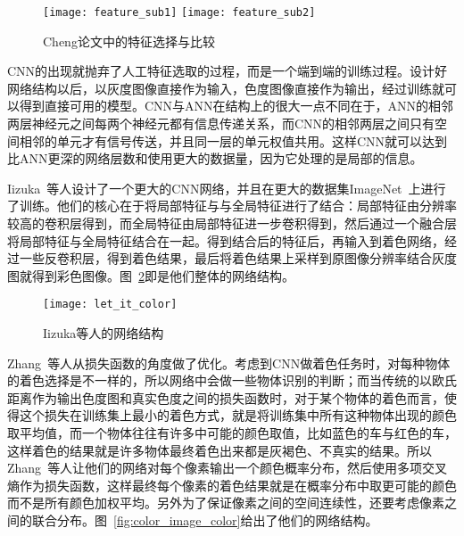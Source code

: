   \begin{figure}[h]
    \centering
      {\texttt{[image: feature\_sub1]}}
    \hspace{4em}
        {\texttt{[image: feature\_sub2]}}
    \caption{Cheng论文中的特征选择与比较}
    \label{fig:feature_choose}
  \end{figure}


  CNN的出现就抛弃了人工特征选取的过程，而是一个端到端的训练过程。设计好网络结构以后，以灰度图像直接作为输入，色度图像直接作为输出，经过训练就可以得到直接可用的模型。CNN与ANN在结构上的很大一点不同在于，ANN的相邻两层神经元之间每两个神经元都有信息传递关系，而CNN的相邻两层之间只有空间相邻的单元才有信号传送，并且同一层的单元权值共用。这样CNN就可以达到比ANN更深的网络层数和使用更大的数据量，因为它处理的是局部的信息。

  Iizuka~\cite{IizukaSIGGRAPH2016}等人设计了一个更大的CNN网络，并且在更大的数据集ImageNet~\cite{DBLP:journals/ijcv/RussakovskyDSKS15}上进行了训练。他们的核心在于将局部特征与与全局特征进行了结合：局部特征由分辨率较高的卷积层得到，而全局特征由局部特征进一步卷积得到，然后通过一个融合层将局部特征与全局特征结合在一起。得到结合后的特征后，再输入到着色网络，经过一些反卷积层，得到着色结果，最后将着色结果上采样到原图像分辨率结合灰度图就得到彩色图像。图~\ref{fig:let_it_color}即是他们整体的网络结构。

  \begin{figure}[H]
    \centering
    \texttt{[image: let\_it\_color]}
    \caption{Iizuka等人的网络结构}
    \label{fig:let_it_color}
  \end{figure}

  Zhang~\cite{zhang2016colorful}等人从损失函数的角度做了优化。考虑到CNN做着色任务时，对每种物体的着色选择是不一样的，所以网络中会做一些物体识别的判断；而当传统的以欧氏距离作为输出色度图和真实色度之间的损失函数时，对于某个物体的着色而言，使得这个损失在训练集上最小的着色方式，就是将训练集中所有这种物体出现的颜色取平均值，而一个物体往往有许多中可能的颜色取值，比如蓝色的车与红色的车，这样着色的结果就是许多物体最终着色出来都是灰褐色、不真实的结果。所以Zhang~\cite{zhang2016colorful}等人让他们的网络对每个像素输出一个颜色概率分布，然后使用多项交叉熵作为损失函数，这样最终每个像素的着色结果就是在概率分布中取更可能的颜色而不是所有颜色加权平均。另外为了保证像素之间的空间连续性，还要考虑像素之间的联合分布。图~\ref{fig:color_image_color}给出了他们的网络结构。

